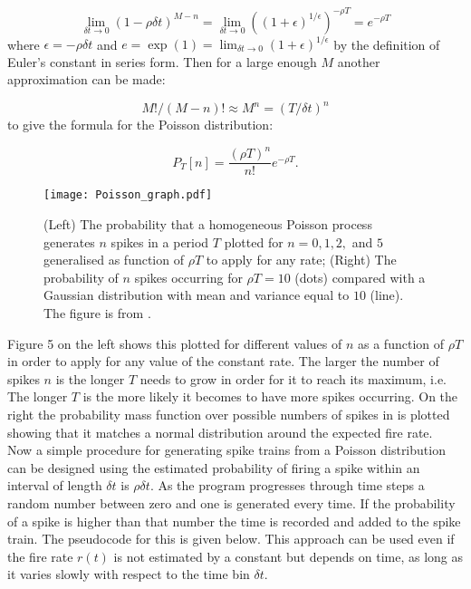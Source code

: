 \documentclass[12pt]{extarticle}
\begin{document}
\begin{equation}
\lim_{\delta t \rightarrow 0} (1-\rho\delta t)^{M-n} = \lim_{\delta t \rightarrow 0} ((1+\epsilon)^{1/\epsilon})^{-\rho T} = e^{-\rho T}
\end{equation}
where $\epsilon=-\rho\delta t$ and $e=\exp(1)=\lim_{\delta t \rightarrow 0} (1+\epsilon)^{1/\epsilon}$ by the definition of Euler's constant in series form. Then for a large enough $M$ another approximation can be made:

\begin{equation}
M!/(M-n)! \approx M^n = (T/\delta t)^n
\end{equation}
to give the formula for the Poisson distribution:

\begin{equation}
P_T[n]=\frac{(\rho T)^n}{n!}e^{-\rho T}.
\end{equation}

\begin{figure}[H]
	\centering
	\texttt{[image: Poisson\_graph.pdf]}
    \caption{(Left) The probability that a homogeneous Poisson process generates $n$
spikes in a period $T$ plotted for $n = 0, 1, 2,$ and $5$ generalised as function of $\rho T$ to apply for any rate; (Right) The probability of $n$ spikes occurring for $\rho T= 10$ (dots) compared with a Gaussian distribution with mean and variance equal to $10$ (line). The figure is from \cite{Dyan-Abbott}.}
\end{figure}

\noindent
Figure 5 on the left shows this plotted for different values of $n$ as a function of $\rho T$ in order to apply for any value of the constant rate. The larger the number of spikes $n$ is the longer $T$ needs to grow in order for it to reach its maximum, i.e. The longer $T$ is the more likely it becomes to have more spikes occurring. On the right the probability mass function over possible numbers of spikes in is plotted showing that it matches a normal distribution around the expected fire rate.\\

\noindent
Now a simple procedure for generating spike trains from a Poisson
distribution can be designed using the estimated probability of firing
a spike within an interval of length $\delta t$ is $\rho\delta t$. As
the program progresses through time steps a random number between zero
and one is generated every time. If the probability of a spike is
higher than that number the time is recorded and added to the spike
train. The pseudocode for this is given below. This approach can be
used even if the fire rate $r(t)$ is not estimated by a constant but
depends on time, as long as it varies slowly with respect to the time
bin $\delta t$.\\
\end{document}
